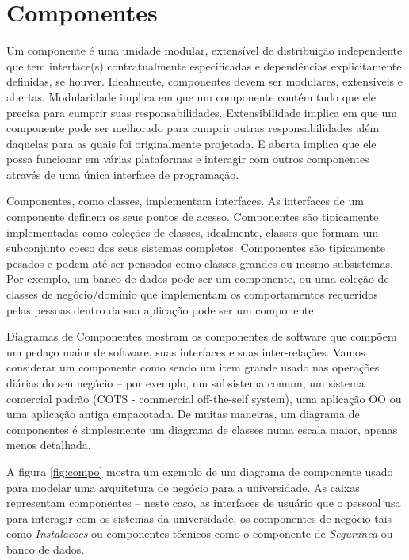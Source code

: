 \documentclass[
	11pt,				%
	openright,
	twoside,			%
	a4paper,			%
	english,			%
	french,
	brazil,				%
	sumario=tradicional
	]{abntex2}
\begin{document}
\section{Componentes}

Um componente é uma unidade modular, extensível de distribuição independente que tem interface(s) contratualmente especificadas e dependências explicitamente definidas, se houver. Idealmente, componentes devem ser modulares, extensíveis e abertas. Modularidade implica em que um componente contém tudo que ele precisa para cumprir suas responsabilidades. Extensibilidade implica em que um componente pode ser melhorado para cumprir outras responsabilidades além daquelas para as quais foi originalmente projetada. E aberta implica que ele possa funcionar em várias plataformas e interagir com outros componentes através de uma única interface de programação.

Componentes, como classes, implementam interfaces. As interfaces de um componente definem os seus pontos de acesso. Componentes são tipicamente implementadas como coleções de classes, idealmente, classes que formam um subconjunto coeso dos seus sistemas completos. Componentes são tipicamente pesados e podem até ser pensados como classes grandes ou mesmo subsistemas. Por exemplo, um banco de dados pode ser um componente, ou uma coleção de classes de negócio/domínio que implementam os comportamentos requeridos pelas pessoas dentro da sua aplicação pode ser um componente.

Diagramas de Componentes mostram os componentes de software que compõem um pedaço maior de software, suas interfaces e suas inter-relações. Vamos considerar um componente como sendo um item grande usado nas operações diárias do seu negócio -- por exemplo, um subsistema comum, um sistema comercial padrão (COTS - commercial off-the-self system), uma aplicação OO ou uma aplicação antiga empacotada. De muitas maneiras, um diagrama de componentes é simplesmente um diagrama de classes numa escala maior, apenas menos detalhada.

A figura \ref{fig:compo} mostra um exemplo de um diagrama de componente usado para modelar uma arquitetura de negócio para a universidade. As caixas representam componentes -- neste caso, as interfaces de usuário que o pessoal usa para interagir com os sistemas da universidade, os componentes de negócio tais como \emph{Instalacoes} ou componentes técnicos como o componente de \emph{Seguranca} ou banco de dados.
\end{document}

